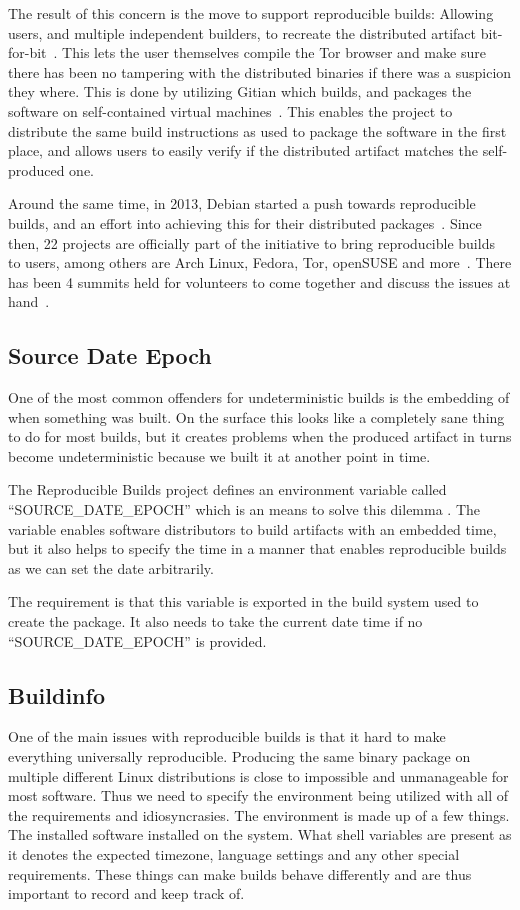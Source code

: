 \documentclass[../Main/thesis.tex]{subfiles}
\begin{document}
The result of this concern is the move to support reproducible builds: Allowing
users, and multiple independent builders, to recreate the distributed artifact
bit-for-bit~\cite{unknown-2014}. This lets the user themselves compile the Tor
browser and make sure there has been no tampering with the distributed binaries
if there was a suspicion they where. This is done by utilizing Gitian which
builds, and packages the software on self-contained virtual
machines~\cite{gitian}. This enables the project to distribute the same build
instructions as used to package the software in the first place, and allows
users to easily verify if the distributed artifact matches the self-produced
one.

Around the same time, in 2013, Debian started a push towards reproducible
builds, and an effort into achieving this for their distributed
packages~\cite{debian-repro-2013}. Since then, 22 projects are officially part
of the initiative to bring reproducible builds to users, among others are Arch
Linux, Fedora, Tor, openSUSE and more~\cite{repro-who}. There has been 4 summits
held for volunteers to come together and discuss the issues at
hand~\cite{repro-paris}.

\subsection*{Source Date Epoch}
One of the most common offenders for undeterministic builds is the embedding of
when something was built. On the surface this looks like a completely sane thing
to do for most builds, but it creates problems when the produced artifact in
turns become undeterministic because we built it at another point in time.

The Reproducible Builds project defines an environment variable called
``SOURCE\_DATE\_EPOCH'' which is an means to solve this dilemma
\cite{reproducible-builds-2019-source-date-epoch}. The variable enables software
distributors to build artifacts with an embedded time, but it also helps to
specify the time in a manner that enables reproducible builds as we can set the
date arbitrarily.

The requirement is that this variable is exported in the build system used to
create the package. It also needs to take the current date time if no
``SOURCE\_DATE\_EPOCH'' is provided.

\subsection*{Buildinfo}%
\label{sub:buildinfo}
One of the main issues with reproducible builds is that it hard to make
everything universally reproducible. Producing the same binary package on
multiple different Linux distributions is close to impossible and unmanageable
for most software. Thus we need to specify the environment being utilized with
all of the requirements and idiosyncrasies. The environment is made up of a few
things. The installed software installed on the system. What shell variables are
present as it denotes the expected timezone, language settings and any other
special requirements. These things can make builds behave differently and are
thus important to record and keep track of.
\end{document}

